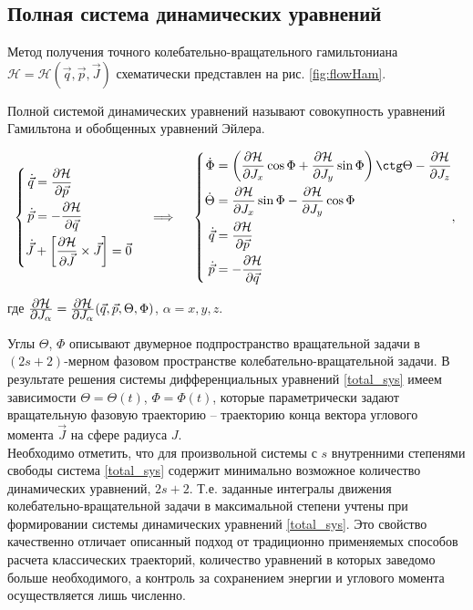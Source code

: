 \subsection{Полная система динамических уравнений}

Метод получения точного колебательно-вращательного гамильтониана $\mathcal{H} = \mathcal{H} (\vec{q}, \vec{p}, \vec{J})$ схематически представлен на рис. \eqref{fig:flowHam}. \par
Полной системой динамических уравнений называют совокупность уравнений Гамильтона и обобщенных уравнений Эйлера.

\vverh
\begin{gather}
\left\{
\begin{aligned}
\dot{\vec{q}} &= \frac{\partial \mathcal{H}}{\partial \vec{p}} \\
\dot{\vec{p}} &= - \frac{\partial \mathcal{H}}{\partial \vec{q}} \\
\dot{\vec{J}} &+ \left[ \frac{\partial \mathcal{H}}{\partial \vec{J}} \times \vec{J} \right] = \vec{0}  
\end{aligned}
\right.
\quad \implies \quad
\left\{
\begin{aligned}
\dot{\Phi} &= \lb \frac{\partial \mathcal{H}}{\partial J_x} \cos \Phi + \frac{\partial \mathcal{H}}{\partial J_y} \sin \Phi \rb \ctg \Theta - \frac{\partial \mathcal{H}}{\partial J_z} \\
\dot{\Theta} &= \frac{\partial \mathcal{H}}{\partial J_x} \sin \Phi - \frac{\partial \mathcal{H}}{\partial J_y} \cos \Phi \\
\dot{\vec{q}} &= \frac{\partial \mathcal{H}}{\partial \vec{p}} \\
\dot{\vec{p}} &= - \frac{\partial \mathcal{H}}{\partial \vec{q}}
\end{aligned},
\right. \label{total_sys}
\end{gather}

\vlevo где $\frac{\displaystyle \partial \mathcal{H}}{\displaystyle \partial J_\alpha} = \frac{\displaystyle \partial \mathcal{H}}{\displaystyle \partial J_\alpha} (\vec{q}, \vec{p}, \Theta, \Phi)$, $\alpha = x,y,z$.

Углы $\Theta$, $\Phi$ описывают двумерное подпространство вращательной задачи в $(2s+2)$-мерном фазовом пространстве колебательно-вращательной задачи. В результате решения системы дифференциальных уравнений \eqref{total_sys} имеем зависимости $\Theta = \Theta(t)$, $\Phi = \Phi(t)$, которые параметрически задают вращательную фазовую траекторию -- траекторию конца вектора углового момента $\vec{J}$ на сфере радиуса $J$.\\
Необходимо отметить, что для произвольной системы с $s$ внутренними степенями свободы система \eqref{total_sys} содержит минимально возможное количество динамических уравнений, $2s+2$. Т.е. заданные интегралы движения колебательно-вращательной задачи в максимальной степени учтены при формировании системы динамических уравнений \eqref{total_sys}. Это свойство качественно отличает описанный подход от традиционно применяемых способов расчета классических траекторий, количество уравнений в которых заведомо больше необходимого, а контроль за сохранением энергии и углового момента осуществляется лишь численно. 

